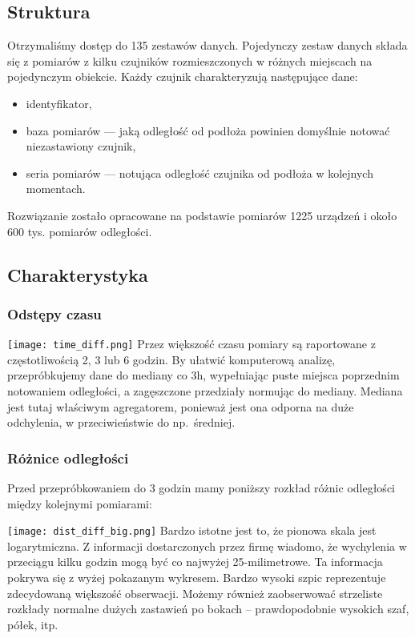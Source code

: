 \documentclass[12pt]{article}
\begin{document}
    \subsection{Struktura}\label{subsec:struktura}
    Otrzymaliśmy dostęp do 135 zestawów danych. Pojedynczy zestaw danych składa się z pomiarów z kilku czujników
    rozmieszczonych w różnych miejscach na pojedynczym obiekcie. Każdy czujnik charakteryzują następujące dane:
    \begin{itemize}
        \item identyfikator,
        \item baza pomiarów — jaką odległość od podłoża powinien domyślnie notować niezastawiony czujnik,
        \item seria pomiarów — notująca odległość czujnika od podłoża w kolejnych momentach.
    \end{itemize}
    Rozwiązanie zostało opracowane na podstawie pomiarów 1225 urządzeń i około 600 tys. pomiarów odległości.

    \subsection{Charakterystyka}\label{subsec:charakterystyka}

    \subsubsection{Odstępy czasu}
    \texttt{[image: time\_diff.png]}
    Przez większość czasu pomiary są raportowane z częstotliwością 2, 3 lub 6 godzin. By ułatwić komputerową analizę,
    przepróbkujemy dane do mediany co 3h, wypełniając puste miejsca poprzednim notowaniem odległości, a zagęszczone
    przedziały normując do mediany. Mediana jest tutaj właściwym agregatorem, ponieważ jest ona odporna na duże
    odchylenia, w przeciwieństwie do np.\ średniej.

    \subsubsection{Różnice odległości}
    Przed przepróbkowaniem do 3 godzin mamy poniższy rozkład różnic odległości między kolejnymi pomiarami:

    \texttt{[image: dist\_diff\_big.png]}
    Bardzo istotne jest to, że pionowa skala jest logarytmiczna. Z informacji dostarczonych przez firmę wiadomo, że
    wychylenia w przeciągu kilku godzin mogą być co najwyżej 25-milimetrowe. Ta informacja pokrywa się z wyżej
    pokazanym wykresem. Bardzo wysoki szpic reprezentuje zdecydowaną większość obserwacji. Możemy również
    zaobserwować strzeliste rozkłady normalne dużych zastawień po bokach -- prawdopodobnie wysokich szaf, półek, itp.
\end{document}
